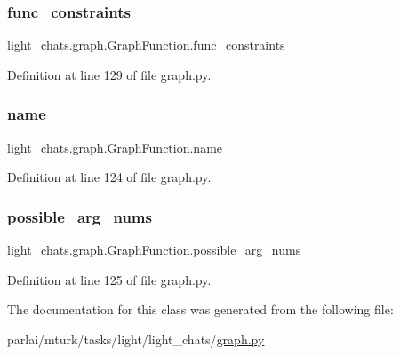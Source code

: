 \subsubsection{\texorpdfstring{func\+\_\+constraints}{func\_constraints}}
{\footnotesize\ttfamily light\+\_\+chats.\+graph.\+Graph\+Function.\+func\+\_\+constraints}



Definition at line 129 of file graph.\+py.

\mbox{\label{classlight__chats_1_1graph_1_1GraphFunction_afb7e1d1d49ff540be034f685f4d1e337}} 
\subsubsection{\texorpdfstring{name}{name}}
{\footnotesize\ttfamily light\+\_\+chats.\+graph.\+Graph\+Function.\+name}



Definition at line 124 of file graph.\+py.

\mbox{\label{classlight__chats_1_1graph_1_1GraphFunction_a2d40c8aa5303afce9e93be14593fca78}} 
\subsubsection{\texorpdfstring{possible\+\_\+arg\+\_\+nums}{possible\_arg\_nums}}
{\footnotesize\ttfamily light\+\_\+chats.\+graph.\+Graph\+Function.\+possible\+\_\+arg\+\_\+nums}



Definition at line 125 of file graph.\+py.



The documentation for this class was generated from the following file\+:\begin{DoxyCompactItemize}
\item 
parlai/mturk/tasks/light/light\+\_\+chats/\hyperlink{parlai_2mturk_2tasks_2light_2light__chats_2graph_8py}{graph.\+py}\end{DoxyCompactItemize}

